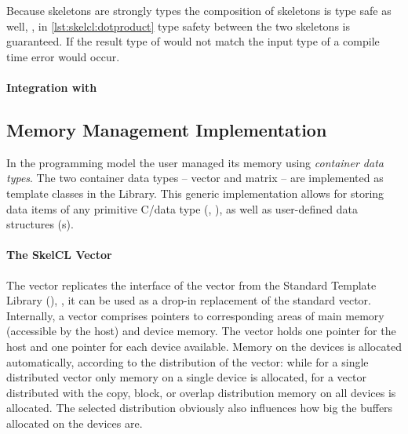 Because skeletons are strongly types the composition of skeletons is type safe as well, \ie, in \autoref{lst:skelcl:dotproduct} type safety between the two skeletons is guaranteed.
If the result type of  would not match the input type of  a compile time error would occur.

\paragraph{Integration with \Cpp}


\subsection{Memory Management Implementation}
\label{section:skelcl-library:memory-management}
In the \SkelCL programming model the user managed its memory using \emph{container data types}.
The two container data types -- vector and matrix -- are implemented as template classes in the \SkelCL Library.
This generic implementation allows for storing data items of any primitive C/\Cpp data type (\eg, ), as well as user-defined data structures (s).

\paragraph{The SkelCL Vector}
The \SkelCL vector replicates the interface of the vector from the Standard Template Library (\STL), \ie, it can be used as a drop-in replacement of the standard vector.
Internally, a vector comprises pointers to corresponding areas of main memory (accessible by the host) and device memory.
The vector holds one pointer for the host and one pointer for each device available.
Memory on the devices is allocated automatically, according to the distribution of the vector:
while for a single distributed vector only memory on a single device is allocated, for a vector distributed with the copy, block, or overlap distribution memory on all devices is allocated.
The selected distribution obviously also influences how big the buffers allocated on the devices are.

